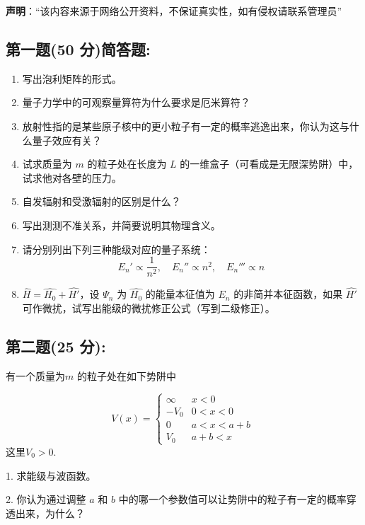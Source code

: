 
\textbf{声明}：“该内容来源于网络公开资料，不保证真实性，如有侵权请联系管理员”

\subsection{第一题(50 分)简答题:}
\begin{enumerate}
  \item 写出泡利矩阵的形式。
  \item 量子力学中的可观察量算符为什么要求是厄米算符？
  \item 放射性指的是某些原子核中的更小粒子有一定的概率逃逸出来，你认为这与什么量子效应有关？
  \item 试求质量为 $m$ 的粒子处在长度为 $L$ 的一维盒子（可看成是无限深势阱）中，试求他对各壁的压力。
  \item 自发辐射和受激辐射的区别是什么？
  \item 写出测测不准关系，并简要说明其物理含义。
  \item 请分别列出下列三种能级对应的量子系统：
  \[    E_n' \propto \frac{1}{n^2}, \quad E_n'' \propto n^2, \quad E_n''' \propto n ~\]
  \item $\hat{H} = \hat{H_0} + \hat{H'}$，设 $\Psi_n$ 为 $\hat{H_0}$ 的能量本征值为 $E_n$ 的非简并本征函数，如果 $\hat{H'}$ 可作微扰，试写出能级的微扰修正公式（写到二级修正）。
\end{enumerate}
\subsection{第二题(25 分):}
有一个质量为$m$ 的粒子处在如下势阱中

\[
V(x) =
\begin{cases} 
    \infty & x < 0 \\
    -V_0 & 0 < x < 0 \\
    0 & a < x < a + b \\
    V_0 &  a + b < x
\end{cases}~
\]
这里\( V_0 > 0 \).

1. 求能级与波函数。

2. 你认为通过调整 \( a \) 和 \( b \) 中的哪一个参数值可以让势阱中的粒子有一定的概率穿透出来，为什么？